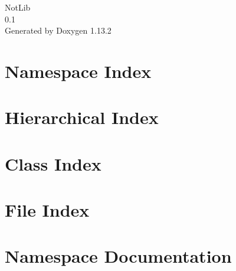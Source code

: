 \documentclass[twoside]{book}
\newcommand{\+}{\discretionary{\mbox{\scriptsize$\hookleftarrow$}}{}{}}
\newcommand{\clearemptydoublepage}{%
    \newpage{\pagestyle{empty}\cleardoublepage}%
  }
\begin{document}
  \raggedbottom
    \hypersetup{pageanchor=false,
                bookmarksnumbered=true,
                pdfencoding=unicode
               }
  \begin{titlepage}
  \vspace*{7cm}
  \begin{center}%
  {\Large Not\+Lib}\\
  [1ex]\large 0.\+1 \\
  \vspace*{1cm}
  {\large Generated by Doxygen 1.13.2}\\
  \end{center}
  \end{titlepage}
  \clearemptydoublepage
  \tableofcontents
  \clearemptydoublepage
  \hypersetup{pageanchor=true}
\chapter{Namespace Index}

\chapter{Hierarchical Index}

\chapter{Class Index}

\chapter{File Index}

\chapter{Namespace Documentation}














\end{document}
